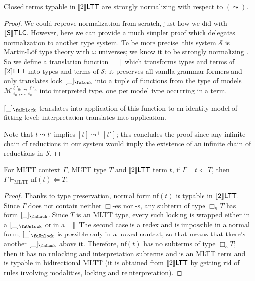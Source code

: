\begin{theorem}
    Closed terms typable in $\llbracket 2\rrbracket\mathsf{LTT}$ are strongly
    normalizing with respect to $(\leadsto)$.
\end{theorem}
\begin{proof}
    We could reprove normalization from scratch, just
    how we did with $\llbracket\mathsf{S}\rrbracket\mathsf{TLC}$. However, here we can
    provide a much simpler proof which delegates
    normalization to another type system. To be more
    precise, this system $\mathcal{S}$ is Martin-L\"of
    type theory with $\omega$ universes; we know it
    to be strongly normalizing
    \cite{coquand2019canonicity}. So we define a
    translation function $[\_]$ which transforms types
    and terms of $\llbracket 2\rrbracket\mathsf{LTT}$ into types and terms of
    $\mathcal{S}$: it preserves all vanilla grammar
    formers and only translates lock
    $[\_]_\text{\faLock}$ into a tuple of functions
    from the type of models
    $\mathcal{M}_{\ell_0,\ldots,\ell_\kappa
    }^{\ell'_0,\ldots,\ell'_\kappa}$ into interpreted
    type, one per model type occurring in a term.

    $[\_]_\text{\faUnlock}$ translates into application
    of this function to an identity model of fitting
    level; interpretation translates into application.

    Note that $t\leadsto t'$ implies
    $[t]\leadsto^+[t']$; this concludes the proof since
    any infinite chain of reductions in our system
    would imply the existence of an infinite chain of
    reductions in $\mathcal{S}$.
\end{proof}

\begin{theorem}
    For MLTT context $\Gamma$, MLTT type $T$ and
    $\llbracket 2\rrbracket\mathsf{LTT}$ term $t$, if
    $\Gamma\vdash t\Leftarrow T$, then
    $\Gamma\vdash_\mathrm{MLTT}\mathrm{nf}(t)\Leftarrow
    T$.
\end{theorem}
\begin{proof}
    Thanks to type preservation, normal form
    $\mathrm{nf}(t)$ is typable in $\llbracket 2\rrbracket\mathsf{LTT}$. Since
    $\Gamma$ does not contain neither $\Box$-es nor
    \faLock-s, any subterm of type $\Box_\kappa T$
    has form $[\_]_\text{\faLock}$. Since $T$ is an MLTT
    type, every such locking is wrapped either in a
    $[\_]_\text{\faUnlock}$ or in a $\llbracket\_
    \rrbracket$. The second case is a redex and is
    impossible in a normal form; $[\_]_\text{\faUnlock}$
    is possible only in a locked context, so that means
    that there's another $[\_]_\text{\faLock}$ above it.
    Therefore, $\mathrm{nf}(t)$ has no subterms of type
    $\Box_\kappa T$; then it has no unlocking and
    interpretation subterms and is an MLTT term and is
    typable in bidirectional MLTT (it is obtained from
    $\llbracket 2\rrbracket\mathsf{LTT}$ by getting rid of rules involving
    modalities, locking and reinterpretation).
\end{proof}

